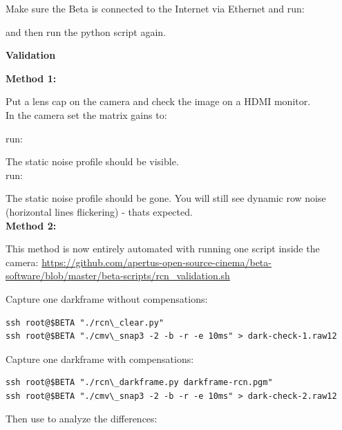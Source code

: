 Make sure the Beta is connected to the Internet via Ethernet and run: 


and then run the python script again.

\textbf{Validation}

\textbf{Method 1:}
	
Put a lens cap on the camera and check the image on a HDMI monitor.\\

In the camera set the matrix gains to: 


run:


The static noise profile should be visible.\\

run: 


The static noise profile should be gone. You will still see dynamic row noise (horizontal lines flickering) - thats expected.\\


\textbf{Method 2:}

This method is now entirely automated with running one script inside the camera: \href{https://github.com/apertus-open-source-cinema/beta-software/blob/master/beta-scripts/rcn_validation.sh}{https://github.com/apertus-open-source-cinema/beta-software/blob/master/beta-scripts/rcn\_validation.sh}

Capture one darkframe without compensations: 

\begin{lstlisting}[breaklines=true, breakatwhitespace=true]
ssh root@$BETA "./rcn\_clear.py"
ssh root@$BETA "./cmv\_snap3 -2 -b -r -e 10ms" > dark-check-1.raw12
\end{lstlisting} 

Capture one darkframe with compensations: 

\begin{lstlisting}[breaklines=true, breakatwhitespace=true]
ssh root@$BETA "./rcn\_darkframe.py darkframe-rcn.pgm"
ssh root@$BETA "./cmv\_snap3 -2 -b -r -e 10ms" > dark-check-2.raw12 
\end{lstlisting} 

Then use  to analyze the differences: 


